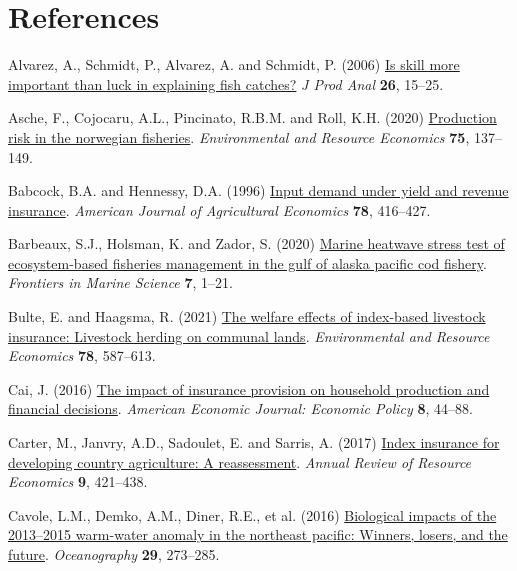 \documentclass[
  letterpaper,
  DIV=11,
  numbers=noendperiod]{scrartcl}
\newlength{\cslhangindent}
\newenvironment{CSLReferences}[2] %
 {\begin{list}{}{%
  \setlength{\itemindent}{0pt}
  \setlength{\leftmargin}{0pt}
  \setlength{\parsep}{0pt}
  \ifodd #1
   \setlength{\leftmargin}{\cslhangindent}
   \setlength{\itemindent}{-1\cslhangindent}
  \fi
  \setlength{\itemsep}{#2\baselineskip}}}
 {\end{list}}
\theoremstyle{plain}
\theoremstyle{plain}
\theoremstyle{remark}
\begin{document}
\section*{References}\label{references}

\label{refs}
\begin{CSLReferences}{1}{0}
Alvarez, A., Schmidt, P., Alvarez, A. and Schmidt, P. (2006)
\href{https://doi.org/10.1007/s11123-006-0002-x}{Is skill more important
than luck in explaining fish catches?} \emph{J Prod Anal} \textbf{26},
15--25.

Asche, F., Cojocaru, A.L., Pincinato, R.B.M. and Roll, K.H. (2020)
\href{https://doi.org/10.1007/s10640-019-00391-2}{Production risk in the
norwegian fisheries}. \emph{Environmental and Resource Economics}
\textbf{75}, 137--149.

Babcock, B.A. and Hennessy, D.A. (1996)
\href{https://doi.org/10.2307/1243713}{Input demand under yield and
revenue insurance}. \emph{American Journal of Agricultural Economics}
\textbf{78}, 416--427.

Barbeaux, S.J., Holsman, K. and Zador, S. (2020)
\href{https://doi.org/10.3389/fmars.2020.00703}{Marine heatwave stress
test of ecosystem-based fisheries management in the gulf of alaska
pacific cod fishery}. \emph{Frontiers in Marine Science} \textbf{7},
1--21.

Bulte, E. and Haagsma, R. (2021)
\href{https://doi.org/10.1007/s10640-021-00545-1}{The welfare effects of
index-based livestock insurance: Livestock herding on communal lands}.
\emph{Environmental and Resource Economics} \textbf{78}, 587--613.

Cai, J. (2016) \href{https://doi.org/10.1257/pol.20130371}{The impact of
insurance provision on household production and financial decisions}.
\emph{American Economic Journal: Economic Policy} \textbf{8}, 44--88.

Carter, M., Janvry, A.D., Sadoulet, E. and Sarris, A. (2017)
\href{https://doi.org/10.1146/annurev-resource-100516-053352}{Index
insurance for developing country agriculture: A reassessment}.
\emph{Annual Review of Resource Economics} \textbf{9}, 421--438.

Cavole, L.M., Demko, A.M., Diner, R.E., et al. (2016)
\href{https://doi.org/10.5670/oceanog.2016.32}{Biological impacts of the
2013--2015 warm-water anomaly in the northeast pacific: Winners, losers,
and the future}. \emph{Oceanography} \textbf{29}, 273--285.


\end{CSLReferences}
\end{document}
